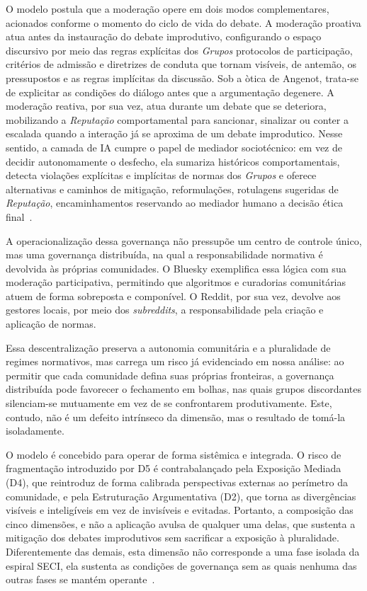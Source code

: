 \documentclass[conference]{IEEEtran} \IEEEoverridecommandlockouts %
\begin{document}
O modelo postula que a moderação opere em dois modos complementares, acionados conforme o momento do ciclo de vida do debate. A moderação proativa atua antes da instauração do debate improdutivo, configurando o espaço discursivo por meio das regras explícitas dos \textit{Grupos} protocolos de participação, critérios de admissão e diretrizes de conduta que tornam visíveis, de antemão, os pressupostos e as regras implícitas da discussão. Sob a òtica de Angenot, trata-se de explicitar as condições do diálogo antes que a argumentação degenere. A moderação reativa, por sua vez, atua durante um debate que se deteriora, mobilizando a \textit{Reputação} comportamental para sancionar, sinalizar ou conter a escalada quando a interação já se aproxima de um debate improdutico. Nesse sentido, a camada de IA cumpre o papel de mediador sociotécnico: em vez de decidir autonomamente o desfecho, ela sumariza históricos comportamentais, detecta violações explícitas e implícitas de normas dos \textit{Grupos} e oferece alternativas e caminhos de mitigação, reformulações, rotulagens sugeridas de \textit{Reputação}, encaminhamentos reservando ao mediador humano a decisão ética final~\cite{zhangAttitudesImaginedRoles2026, brandiLLMMediatedNudgeBasedText}.

A operacionalização dessa governança não pressupõe um centro de controle único, mas uma governança distribuída, na qual a responsabilidade normativa é devolvida às próprias comunidades. O Bluesky exemplifica essa lógica com sua moderação participativa, permitindo que algoritmos e curadorias comunitárias atuem de forma sobreposta e componível. O Reddit, por sua vez, devolve aos gestores locais, por meio dos \textit{subreddits}, a responsabilidade pela criação e aplicação de normas.

Essa descentralização preserva a autonomia comunitária e a pluralidade de regimes normativos, mas carrega um risco já evidenciado em nossa análise: ao permitir que cada comunidade defina suas próprias fronteiras, a governança distribuída pode favorecer o fechamento em bolhas, nas quais grupos discordantes silenciam-se mutuamente em vez de se confrontarem produtivamente. Este, contudo, não é um defeito intrínseco da dimensão, mas o resultado de tomá-la isoladamente. 


O modelo é concebido para operar de forma sistêmica e integrada. O risco de fragmentação introduzido por D5 é contrabalançado pela Exposição Mediada (D4), que reintroduz de forma calibrada perspectivas externas ao perímetro da comunidade, e pela Estruturação Argumentativa (D2), que torna as divergências visíveis e inteligíveis em vez de invisíveis e evitadas. Portanto, a composição das cinco dimensões, e não a aplicação avulsa de qualquer uma delas, que sustenta a mitigação dos debates improdutivos sem sacrificar a exposição à pluralidade. Diferentemente das demais, esta dimensão não corresponde a uma fase isolada da espiral SECI, ela sustenta as condições de governança sem as quais nenhuma das outras fases se mantém operante~\cite{nonaka1994dynamic}.
\end{document}
